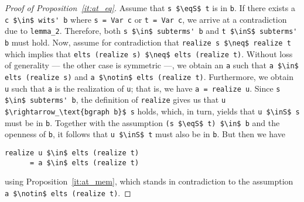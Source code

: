 \documentclass[sigplan,10pt,anonymous,review]{acmart}
\newcommand{\inS}{\in_\text{s}}
\newcommand{\eqS}{=_\text{s}}
\begin{document}
\begin{proof}[Proof of Proposition~\ref{it:at_eq}]
  Assume that \lstinline!s $\eqS$ t! is in \lstinline!b!.
  If there exists a \lstinline!c $\in$ wits' b! where \lstinline!s = Var c! or \lstinline!t = Var c!, we arrive at a contradiction due to \lstinline!lemma_2!.
  Therefore, both \lstinline!s $\in$ subterms' b! and \lstinline!t $\inS$ subterms' b! must hold.
  Now, assume for contradiction that \lstinline!realize s $\neq$ realize t! which implies that \lstinline!elts (realize s) $\neq$ elts (realize t)!.
  Without loss of generality --- the other case is symmetric ---, we obtain an \lstinline!a! such that \lstinline!a $\in$ elts (realize s)! and \lstinline!a $\notin$ elts (realize t)!. 
  Furthermore, we obtain \lstinline!u! such that \lstinline!a! is the realization of \lstinline!u!;
  that is, we have \lstinline!a = realize u!.
  Since \lstinline!s $\in$ subterms' b!, the definition of \lstinline!realize! gives us that \lstinline!u $\rightarrow_\text{bgraph b}$ s! holds, which, in turn, yields that \lstinline!u $\inS$ s! must be in \lstinline!b!.
  Together with the assumption \lstinline!(s $\eqS$ t) $\in$ b! and the openness of \lstinline!b!, it follows that \lstinline!u $\inS$ t! must also be in \lstinline!b!.
  But then we have
\begin{lstlisting}[columns=fixed]
realize u $\in$ elts (realize t)
      = a $\in$ elts (realize t)
\end{lstlisting}
  using Proposition~\ref{it:at_mem}, which stands in contradiction to the assumption \lstinline!a $\notin$ elts (realize t)!.
\end{proof}
\end{document}
